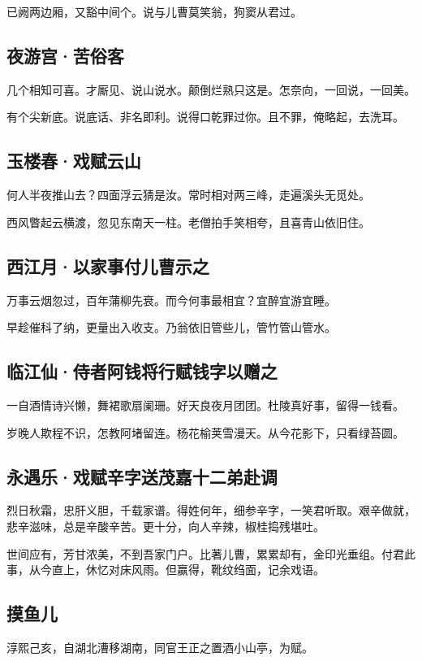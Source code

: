 \documentclass[a5paper]{ctexart}
\begin{document}
	已阙两边厢，又豁中间个。说与儿曹莫笑翁，狗窦从君过。
	
	\subsection{夜游宫·苦俗客}
	几个相知可喜。才厮见、说山说水。颠倒烂熟只这是。怎奈向，一回说，一回美。
	
	有个尖新底。说底话、非名即利。说得口乾罪过你。且不罪，俺略起，去洗耳。
	
	\subsection{玉楼春·戏赋云山}
	何人半夜推山去？四面浮云猜是汝。常时相对两三峰，走遍溪头无觅处。
	
	西风瞥起云横渡，忽见东南天一柱。老僧拍手笑相夸，且喜青山依旧住。
	
	\subsection{西江月·以家事付儿曹示之}
	万事云烟忽过，百年蒲柳先衰。而今何事最相宜？宜醉宜游宜睡。
	
	早趁催科了纳，更量出入收支。乃翁依旧管些儿，管竹管山管水。
	
	\subsection{临江仙·侍者阿钱将行赋钱字以赠之}
	一自酒情诗兴懒，舞裙歌扇阑珊。好天良夜月团团。杜陵真好事，留得一钱看。
	
	岁晚人欺程不识，怎教阿堵留连。杨花榆荚雪漫天。从今花影下，只看绿苔圆。
	
	\subsection{永遇乐·戏赋辛字送茂嘉十二弟赴调}
	烈日秋霜，忠肝义胆，千载家谱。得姓何年，细参辛字，一笑君听取。艰辛做就，悲辛滋味，总是辛酸辛苦。更十分，向人辛辣，椒桂捣残堪吐。
	
	世间应有，芳甘浓美，不到吾家门户。比著儿曹，累累却有，金印光垂组。付君此事，从今直上，休忆对床风雨。但赢得，靴纹绉面，记余戏语。
	
	\subsection{摸鱼儿}
	\begin{small}
		淳熙己亥，自湖北漕移湖南，同官王正之置酒小山亭，为赋。
	\end{small}
	
\end{document}
